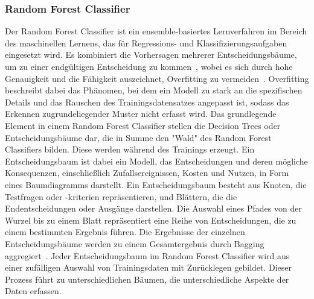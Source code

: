 \pagebreak

\subsubsection*{Random Forest Classifier}
Der Random Forest Classifier ist ein ensemble-basiertes Lernverfahren im Bereich des maschinellen Lernens, das für Regressions- und Klassifizierungsaufgaben eingesetzt wird. Es kombiniert die Vorhersagen mehrerer Entscheidungsbäume, um zu einer endgültigen Entscheidung zu kommen~\cite[S. 456]{10.5555/3133359}, wobei es sich durch hohe Genauigkeit und die Fähigkeit auszeichnet, Overfitting zu vermeiden~\cite[S. 455]{10.5555/3133359}.
Overfitting beschreibt dabei das Phänomen, bei dem ein Modell zu stark an die spezifischen Details und das Rauschen des Trainingsdatensatzes angepasst ist, sodass das Erkennen zugrundeliegender Muster nicht erfasst wird.
Das grundlegende Element in einem Random Forest Classifier stellen die Decision Trees oder Entscheidungsbäume dar, die in Summe den "Wald" des Random Forest Classifiers bilden. Diese werden während des Trainings erzeugt.
Ein Entscheidungsbaum ist dabei ein Modell, das Entscheidungen und deren mögliche Konsequenzen, einschließlich Zufallsereignissen, Kosten und Nutzen, in Form eines Baumdiagramms darstellt. Ein Entscheidungsbaum besteht aus Knoten, die Testfragen oder -kriterien repräsentieren, und Blättern, die die Endentscheidungen oder Ausgänge darstellen. Die Auswahl eines Pfades von der Wurzel bis zu einem Blatt repräsentiert eine Reihe von Entscheidungen, die zu einem bestimmten Ergebnis führen.
Die Ergebnisse der einzelnen Entscheidungsbäume werden zu einem Gesamtergebnis durch Bagging aggregiert~\cite[S. 456]{10.5555/3133359}. Jeder Entscheidungsbaum im Random Forest Classifier wird aus einer zufälligen Auswahl von Trainingsdaten mit Zurücklegen gebildet. Dieser Prozess führt zu unterschiedlichen Bäumen, die unterschiedliche Aspekte der Daten erfassen.